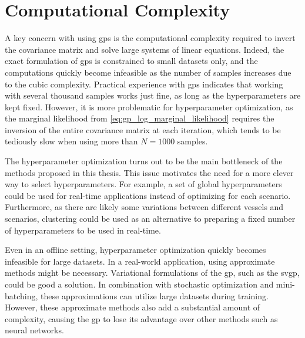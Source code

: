 \section{Computational Complexity}
A key concern with using \acrshort{gp}s is the computational complexity required to invert the covariance matrix and solve large systems of linear equations. Indeed, the exact formulation of \acrshort{gp}s is constrained to small datasets only, and the computations quickly become infeasible as the number of samples increases due to the cubic complexity. Practical experience with \acrshort{gp}s indicates that working with several thousand samples works just fine, as long as the hyperparameters are kept fixed. However, it is more problematic for hyperparameter optimization, as the marginal likelihood from \cref{eq:gp_log_marginal_likelihood} requires the inversion of the entire covariance matrix at each iteration, which tends to be tediously slow when using more than $N=1000$ samples. 

The hyperparameter optimization turns out to be the main bottleneck of the methods proposed in this thesis. This issue motivates the need for a more clever way to select hyperparameters. For example, a set of global hyperparameters could be used for real-time applications instead of optimizing for each scenario. Furthermore, as there are likely some variations between different vessels and scenarios, clustering could be used as an alternative to preparing a fixed number of hyperparameters to be used in real-time.

Even in an offline setting, hyperparameter optimization quickly becomes infeasible for large datasets. In a real-world application, using approximate methods might be necessary. Variational formulations of the \acrshort{gp}, such as the \acrshort{svgp}, could be good a solution. In combination with stochastic optimization and mini-batching, these approximations can utilize large datasets during training. However, these approximate methods also add a substantial amount of complexity, causing the \acrshort{gp} to lose its advantage over other methods such as neural networks.


